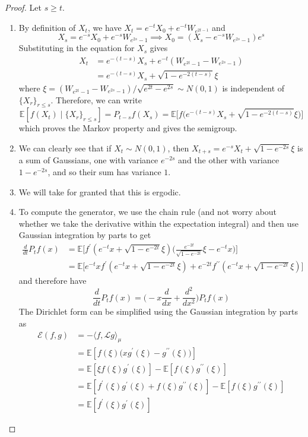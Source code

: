 \documentclass{article}
\begin{document}
  \begin{proof}
  Let $s \geq t$. 
  \begin{enumerate}
      \item By definition of $X_t$, we have $X_t = e^{-t} X_0 + e^{-t} W_{e^{2t - 1}}$ and 
      \[X_s = e^{-s} X_0 + e^{-s} W_{e^{2s} - 1} \implies X_0 = (X_s - e^{-s} W_{e^{2s} - 1} ) e^{s}\]
      Substituting in the equation for $X_s$ gives 
      \begin{align*}
          X_t & = e^{-(t - s)} X_s + e^{-t} (W_{e^{2t} - 1} - W_{e^{2s} - 1}) \\
          & = e^{-(t - s)} X_s + \sqrt{1 - e^{-2 (t - s)}} \xi
      \end{align*}
      where $\xi = (W_{e^{2t} - 1} - W_{e^{2s} - 1}) / \sqrt{e^{2t} - e^{2s}} \sim N(0, 1)$ is independent of $\{X_r\}_{r \leq s}$. Therefore, we can write 
      \[\mathbb{E}[ f(X_t) \mid \{X_r\}_{r \leq s}] = P_{t - s} f (X_s) = \mathbb{E}\big[f \big( e^{-(t - s)} X_s + \sqrt{1 - e^{-2 (t - s)}} \xi \big) \big]\]
      which proves the Markov property and gives the semigroup. 
      
      \item We can clearly see that if $X_t \sim N(0, 1)$, then $X_{t + s} = e^{-s} X_t + \sqrt{1 - e^{-2s}}\xi$ is a sum of Gaussians, one with variance $e^{-2s}$ and the other with variance $1 - e^{-2s}$, and so their sum has variance $1$. 
      
      \item We will take for granted that this is ergodic. 
      
      \item To compute the generator, we use the chain rule (and not worry about whether we take the derivative within the expectation integral) and then use Gaussian integration by parts to get 
      \begin{align*}
          \frac{d}{dt} P_t f(x) & = \mathbb{E} \bigg[ f^\prime (e^{-t} x + \sqrt{1 - e^{-2t}} \xi) \bigg( \frac{e^{-2t}}{\sqrt{1 - e^{-2t}}} \xi - e^{-t} x \bigg) \bigg] \\
          & = \mathbb{E} \big[ e^{-t} x f^\prime (e^{-t} x + \sqrt{1 - e^{-2t}} \xi) + e^{-2t} f^{\prime\prime} (e^{-t} x + \sqrt{1 - e^{-2t}} \xi ) \big]
      \end{align*}
      and therefore have 
      \[\frac{d}{dt} P_t f (x) = \bigg( -x \frac{d}{dx} + \frac{d^2}{dx^2} \bigg) P_t f (x)\]
      The Dirichlet form can be simplified using the Gaussian integration by parts as 
      \begin{align*}
          \mathcal{E} (f, g) & = - \langle f, \mathscr{L} g \rangle_\mu \\
          & = \mathbb{E}[ f(\xi) \big( x g^\prime (\xi) - g^{\prime\prime} (\xi) \big)] \\
          & = \mathbb{E}[\xi f(\xi) g^\prime(\xi)] - \mathbb{E}[f(\xi) g^{\prime\prime} (\xi)] \\
          & = \mathbb{E}[f^\prime (\xi) g^\prime (\xi) + f(\xi) g^{\prime\prime} (\xi)] - \mathbb{E}[f(\xi) g^{\prime\prime} (\xi)] \\
          & = \mathbb{E}[f^\prime (\xi) g^\prime (\xi) ]
      \end{align*} 
      

\end{enumerate}
\end{proof}
\end{document}

